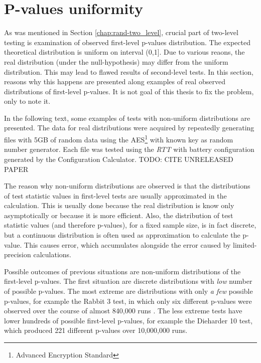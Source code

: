 \documentclass[
  digital,     %
  oneside,     %
  nosansbold,  %
  nocolorbold, %
  nolof,         %
  nolot,         %
]{fithesis4}
\begin{document}
\section{P-values uniformity} \label{chap:analysis-uniform}
As was mentioned in Section \ref{chap:rand-two_level}, crucial part of two-level testing is examination of observed first-level p-values distribution. The expected theoretical distribution is uniform on interval (0,1]. \cite[p.~14]{bad_day} Due to various reaons, the real distribution (under the null-hypothesis) may differ from the uniform distribution. This may lead to flawed results of second-level tests. In this section, reasons why this happens are presented along examples of real observed distributions of first-level p-values. It is not goal of this thesis to fix the problem, only to note it.

In the following text, some examples of tests with non-uniform distributions are presented. The data for real distributions were acquired by repeatedly generating files with 5GB of random data using the AES\footnote{Advanced Encryption Standard} with known key as random number generator. Each file was tested using the \emph{RTT} with battery configuration generated by the Configuration Calculator. 
TODO: CITE UNRELEASED PAPER

The reason why non-uniform distributions are observed is that the distributions of test statistic values in first-level tests are usually approximated in the calculation. This is usually done because the real distribution is know only asymptotically or because it is more efficient. Also, the distribution of test statistic values (and therefore p-values), for a fixed sample size, is in fact discrete, but a continuous distribution is often used as approximation to calculate the p-value. This causes error, which accumulates alongside the error caused by limited-precision calculations. \cite[p. 7]{bad_day}

Possible outcomes of previous situations are non-uniform distributions of the first-level p-values. The first situation are discrete distributions with \emph{low} number of possible p-values. The most extreme are distributions with only \emph{a few} possible p-values, for example the Rabbit 3 test, in which only six different p-values were observed over the course of almost 840,000 runs . The less extreme tests have lower hundreds of possible first-level p-values, for example the Dieharder 10 test, which produced 221 different p-values over 10,000,000 runs.
\end{document}
